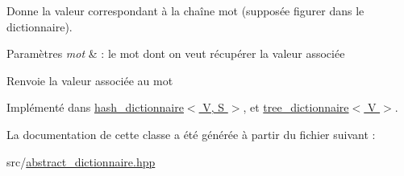 Donne la valeur correspondant à la chaîne mot (supposée figurer dans le dictionnaire). 


\begin{DoxyParams}{Paramètres}
{\em mot} & \-: le mot dont on veut récupérer la valeur associée \\
\hline
\end{DoxyParams}
\begin{DoxyReturn}{Renvoie}
la valeur associée au mot 
\end{DoxyReturn}


Implémenté dans \hyperlink{classhash__dictionnaire_a7b7b3c0023fa68a6932d839feda7c1f2}{hash\-\_\-dictionnaire$<$ V, S $>$}, et \hyperlink{classtree__dictionnaire_a7fb5e78b2bf0d5e75c9aebb870d43879}{tree\-\_\-dictionnaire$<$ V $>$}.



La documentation de cette classe a été générée à partir du fichier suivant \-:\begin{DoxyCompactItemize}
\item 
src/\hyperlink{abstract__dictionnaire_8hpp}{abstract\-\_\-dictionnaire.\-hpp}\end{DoxyCompactItemize}

